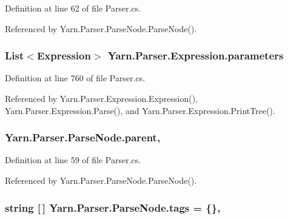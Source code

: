 Definition at line 62 of file Parser.\-cs.



Referenced by Yarn.\-Parser.\-Parse\-Node.\-Parse\-Node().

\hypertarget{a00106_a7b21380bead8ae08b2cfc6594edab32c}{
\subsubsection[{parameters}]{\setlength{\rightskip}{0pt plus 5cm}List$<${\bf Expression}$>$ Yarn.\-Parser.\-Expression.\-parameters\hspace{0.3cm}{\ttfamily [package]}}}\label{a00106_a7b21380bead8ae08b2cfc6594edab32c}


Definition at line 760 of file Parser.\-cs.



Referenced by Yarn.\-Parser.\-Expression.\-Expression(), Yarn.\-Parser.\-Expression.\-Parse(), and Yarn.\-Parser.\-Expression.\-Print\-Tree().

\hypertarget{a00150_af313a82103fcc2ff5a177dbb06b92f7b}{
\subsubsection[{parent}]{ Yarn.\-Parser.\-Parse\-Node.\-parent\hspace{0.3cm}{\ttfamily [package]}, {\ttfamily [inherited]}}}\label{a00150_af313a82103fcc2ff5a177dbb06b92f7b}


Definition at line 59 of file Parser.\-cs.



Referenced by Yarn.\-Parser.\-Parse\-Node.\-Parse\-Node().

\hypertarget{a00150_a58b3a15788fd2d4127d73619dc6d04ae}{
\subsubsection[{tags}]{\setlength{\rightskip}{0pt plus 5cm}string \mbox{[}$\,$\mbox{]} Yarn.\-Parser.\-Parse\-Node.\-tags = \{\}\hspace{0.3cm}{\ttfamily [package]}, {\ttfamily [inherited]}}}\label{a00150_a58b3a15788fd2d4127d73619dc6d04ae}


